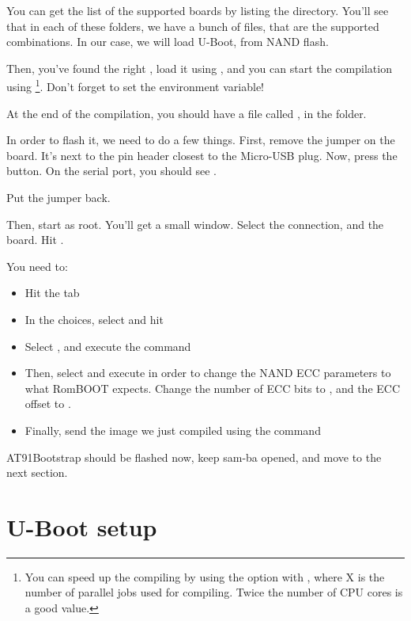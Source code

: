 You can get the list of the supported boards by listing the
 directory. You'll see that in each of these folders, we
have a bunch of  files, that are the supported
combinations. In our case, we will load U-Boot, from NAND flash.

Then, you've found the right , load it using
, and you can start the compilation using
\footnote{You can speed up the compiling by using the
   option with , where X is the number of
  parallel jobs used for compiling. Twice the number of CPU cores is a
  good value.}. Don't forget to set the 
environment variable!

At the end of the compilation, you should have a file called
, in the
 folder.

In order to flash it, we need to do a few things. First, remove the
 jumper on the board. It's next to the pin header
closest to the Micro-USB plug. Now, press the  button.
On the serial port, you should see .

Put the jumper back.

Then, start  as root. You'll get a small window. Select
the  connection, and the  board. Hit
.

You need to:
\begin{itemize}
\item Hit the  tab
\item In the  choices, select 
      and hit 
\item Select , and execute the command
\item Then, select and execute 
  in order to change the NAND ECC parameters to what RomBOOT expects.
  Change the number of ECC bits to , and the ECC offset to
  .
\item Finally, send the image we just compiled using the command
\end{itemize}

AT91Bootstrap should be flashed now, keep sam-ba opened, and move to
the next section.

\section{U-Boot setup}

